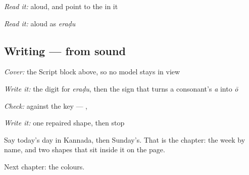 \emph{Read it:} \textbf{} aloud, and point to the  in it

\emph{Read it:} \textbf{} aloud as \emph{eraḍu}

\subsection*{Writing — from sound}
\emph{Cover:} the Script block above, so no model stays in view

\emph{Write it:} the digit for \emph{eraḍu}, then the sign that turns a consonant's \emph{a} into \emph{ō}

\emph{Check:} against the key — \textbf{}, \textbf{}

\emph{Write it:} one repaired shape, then stop

\begin{tcolorbox}[breakable,colback=teal!4,colframe=teal!35!black,title={Before you move on}]
Say today's day in Kannada, then Sunday's. That is the chapter: the week by name, and two shapes that sit inside it on the page.

Next chapter: the colours.
\end{tcolorbox}
